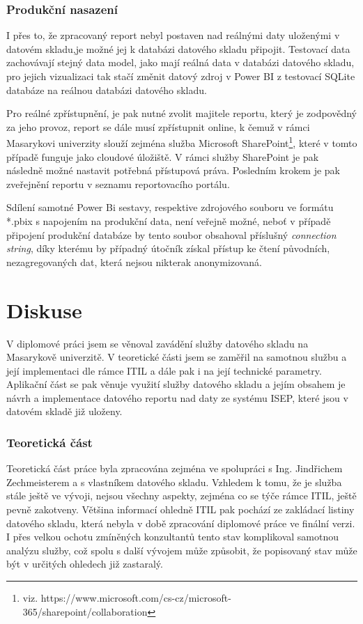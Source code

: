 \documentclass[
  digital,     %
  twoside,     %
  lof,         %
  lot,         %
]{fithesis4}
\begin{document}
\subsection{Produkční nasazení}
I přes to, že zpracovaný report nebyl postaven nad reálnými daty uloženými v datovém skladu,je možné jej k databázi datového skladu připojit. Testovací data zachovávají stejný data model, jako mají reálná data v databázi datového skladu, pro jejich vizualizaci tak stačí změnit datový zdroj v Power BI z testovací SQLite databáze na reálnou databázi datového skladu. 

Pro reálné zpřístupnění, je pak nutné zvolit majitele reportu, který je zodpovědný za jeho provoz, report se dále musí zpřístupnit online, k čemuž v rámci Masarykovi univerzity slouží zejména služba Microsoft SharePoint\footnote{viz. https://www.microsoft.com/cs-cz/microsoft-365/sharepoint/collaboration}, které v tomto případě funguje jako cloudové úložiště. V rámci služby SharePoint je pak následně možné nastavit potřebná přístupová práva. Posledním krokem je pak zveřejnění reportu v seznamu reportovacího portálu.

Sdílení samotné Power Bi sestavy, respektive zdrojového souboru ve formátu *.pbix s napojením na produkční data, není veřejně možné, neboť v případě připojení produkční databáze by tento soubor obsahoval příslušný \emph{connection string}, díky kterému by případný útočník získal přístup ke čtení původních, nezagregovaných dat, která nejsou nikterak anonymizovaná.

\chapter{Diskuse}
V diplomové práci jsem se věnoval zavádění služby datového skladu na Masarykově univerzitě. V teoretické části jsem se zaměřil na samotnou službu a její implementaci dle rámce ITIL a dále pak i na její technické parametry. Aplikační část se pak věnuje využití služby datového skladu a jejím obsahem je návrh a implementace datového reportu nad daty ze systému ISEP, které jsou v datovém skladě již uloženy. 

\subsection{Teoretická část}
Teoretická část práce byla zpracována zejména ve spolupráci s Ing. Jindřichem Zechmeisterem a s vlastníkem datového skladu. Vzhledem k tomu, že je služba stále ještě ve vývoji, nejsou všechny aspekty, zejména co se týče rámce ITIL, ještě pevně zakotveny. Většina informací ohledně ITIL pak pochází ze zakládací listiny datového skladu, která nebyla v době zpracování diplomové práce ve finální verzi. I přes velkou ochotu zmíněných konzultantů tento stav komplikoval samotnou analýzu služby, což spolu s další vývojem může způsobit, že popisovaný stav může být v určitých ohledech již zastaralý. 
\end{document}
